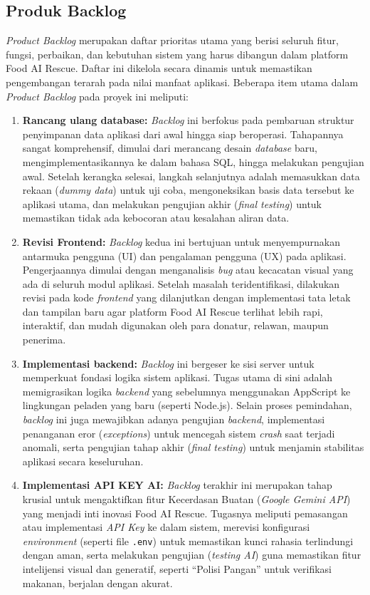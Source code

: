\subsection{Produk Backlog}
\textit{Product Backlog} merupakan daftar prioritas utama yang berisi seluruh fitur, fungsi, perbaikan, dan kebutuhan sistem yang harus dibangun dalam platform Food AI Rescue. Daftar ini dikelola secara dinamis untuk memastikan pengembangan terarah pada nilai manfaat aplikasi. Beberapa item utama dalam \textit{Product Backlog} pada proyek ini meliputi:
\begin{enumerate}
    \item \textbf{Rancang ulang database:} \textit{Backlog} ini berfokus pada pembaruan struktur penyimpanan data aplikasi dari awal hingga siap beroperasi. Tahapannya sangat komprehensif, dimulai dari merancang desain \textit{database} baru, mengimplementasikannya ke dalam bahasa SQL, hingga melakukan pengujian awal. Setelah kerangka selesai, langkah selanjutnya adalah memasukkan data rekaan (\textit{dummy data}) untuk uji coba, mengoneksikan basis data tersebut ke aplikasi utama, dan melakukan pengujian akhir (\textit{final testing}) untuk memastikan tidak ada kebocoran atau kesalahan aliran data.
    \item \textbf{Revisi Frontend:} \textit{Backlog} kedua ini bertujuan untuk menyempurnakan antarmuka pengguna (UI) dan pengalaman pengguna (UX) pada aplikasi. Pengerjaannya dimulai dengan menganalisis \textit{bug} atau kecacatan visual yang ada di seluruh modul aplikasi. Setelah masalah teridentifikasi, dilakukan revisi pada kode \textit{frontend} yang dilanjutkan dengan implementasi tata letak dan tampilan baru agar platform Food AI Rescue terlihat lebih rapi, interaktif, dan mudah digunakan oleh para donatur, relawan, maupun penerima.
    \item \textbf{Implementasi backend:} \textit{Backlog} ini bergeser ke sisi server untuk memperkuat fondasi logika sistem aplikasi. Tugas utama di sini adalah memigrasikan logika \textit{backend} yang sebelumnya menggunakan AppScript ke lingkungan peladen yang baru (seperti Node.js). Selain proses pemindahan, \textit{backlog} ini juga mewajibkan adanya pengujian \textit{backend}, implementasi penanganan eror (\textit{exceptions}) untuk mencegah sistem \textit{crash} saat terjadi anomali, serta pengujian tahap akhir (\textit{final testing}) untuk menjamin stabilitas aplikasi secara keseluruhan.
    \item \textbf{Implementasi API KEY AI:} \textit{Backlog} terakhir ini merupakan tahap krusial untuk mengaktifkan fitur Kecerdasan Buatan (\textit{Google Gemini API}) yang menjadi inti inovasi Food AI Rescue. Tugasnya meliputi pemasangan atau implementasi \textit{API Key} ke dalam sistem, merevisi konfigurasi \textit{environment} (seperti file \texttt{.env}) untuk memastikan kunci rahasia terlindungi dengan aman, serta melakukan pengujian (\textit{testing AI}) guna memastikan fitur intelijensi visual dan generatif, seperti ``Polisi Pangan'' untuk verifikasi makanan, berjalan dengan akurat.
\end{enumerate}
